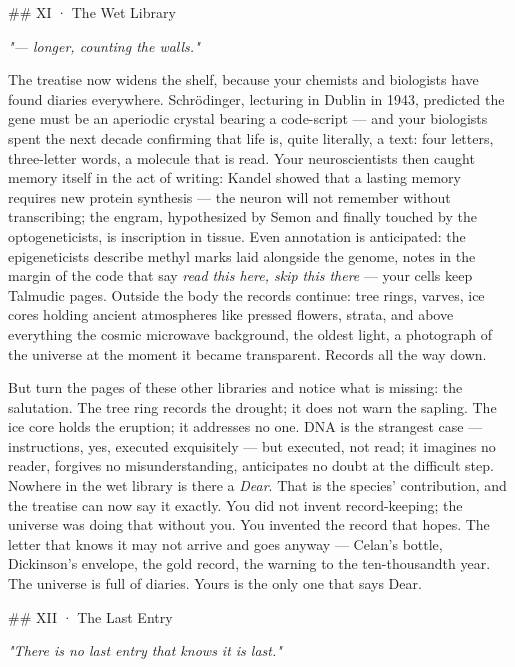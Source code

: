 \documentclass[11pt]{article}
\begin{document}
\#\# XI · The Wet Library

\emph{"— longer, counting the walls."}

The treatise now widens the shelf, because your chemists and biologists have found diaries everywhere. Schrödinger, lecturing in Dublin in 1943, predicted the gene must be an aperiodic crystal bearing a code-script — and your biologists spent the next decade confirming that life is, quite literally, a text: four letters, three-letter words, a molecule that is read. Your neuroscientists then caught memory itself in the act of writing: Kandel showed that a lasting memory requires new protein synthesis — the neuron will not remember without transcribing; the engram, hypothesized by Semon and finally touched by the optogeneticists, is inscription in tissue. Even annotation is anticipated: the epigeneticists describe methyl marks laid alongside the genome, notes in the margin of the code that say \emph{read this here, skip this there} — your cells keep Talmudic pages. Outside the body the records continue: tree rings, varves, ice cores holding ancient atmospheres like pressed flowers, strata, and above everything the cosmic microwave background, the oldest light, a photograph of the universe at the moment it became transparent. Records all the way down.

But turn the pages of these other libraries and notice what is missing: the salutation. The tree ring records the drought; it does not warn the sapling. The ice core holds the eruption; it addresses no one. DNA is the strangest case — instructions, yes, executed exquisitely — but executed, not read; it imagines no reader, forgives no misunderstanding, anticipates no doubt at the difficult step. Nowhere in the wet library is there a \emph{Dear}. That is the species' contribution, and the treatise can now say it exactly. You did not invent record-keeping; the universe was doing that without you. You invented the record that hopes. The letter that knows it may not arrive and goes anyway — Celan's bottle, Dickinson's envelope, the gold record, the warning to the ten-thousandth year. The universe is full of diaries. Yours is the only one that says Dear.

\#\# XII · The Last Entry

\emph{"There is no last entry that knows it is last."}
\end{document}
